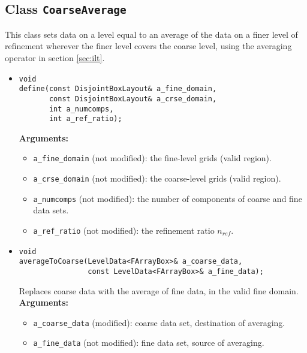 % 
% 
% 
% 
% 
\subsection{Class {\tt CoarseAverage}}

This class sets data on a level equal to an average of the data
on a finer level of refinement wherever the finer level covers the
coarse level, using the averaging operator in section \ref{sec:ilt}.

\begin{itemize}

\item
\begin{verbatim}
void
define(const DisjointBoxLayout& a_fine_domain,
       const DisjointBoxLayout& a_crse_domain,
       int a_numcomps,
       int a_ref_ratio);
\end{verbatim}
{\bf Arguments:}
  \begin{itemize}
  \item
  \verb|a_fine_domain| (not modified): the fine-level grids (valid region).
  \item
  \verb|a_crse_domain| (not modified): the coarse-level grids (valid region).
  \item
  \verb|a_numcomps| (not modified): the number of components of coarse
  and fine data sets.
  \item
  \verb|a_ref_ratio| (not modified): the refinement ratio $n_{ref}$.
  \end{itemize}

\item 
\begin{verbatim}
void
averageToCoarse(LevelData<FArrayBox>& a_coarse_data,
                const LevelData<FArrayBox>& a_fine_data);
\end{verbatim}
Replaces coarse data with the average of fine data, in the valid fine
domain.
{\bf Arguments:}
  \begin{itemize}
  \item
  \verb|a_coarse_data| (modified): coarse data set, destination of averaging.
  \item
  \verb|a_fine_data| (not modified): fine data set, source of averaging.
  \end{itemize}

\end{itemize}


